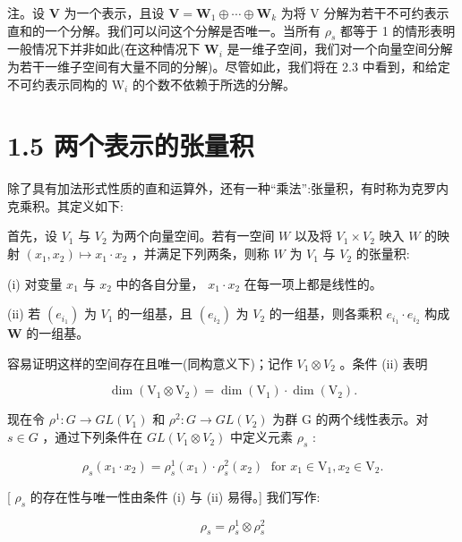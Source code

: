 \documentclass[10pt]{article}
\begin{document}
注。设 \(\mathbf{V}\) 为一个表示，且设 \(\mathbf{V} = {\mathbf{W}}_{1} \oplus  \cdots  \oplus  {\mathbf{W}}_{k}\) 为将 \(\mathrm{V}\) 分解为若干不可约表示直和的一个分解。我们可以问这个分解是否唯一。当所有 \({\rho }_{s}\) 都等于 1 的情形表明一般情况下并非如此(在这种情况下 \({\mathbf{W}}_{i}\) 是一维子空间，我们对一个向量空间分解为若干一维子空间有大量不同的分解)。尽管如此，我们将在 2.3 中看到，和给定不可约表示同构的 \({\mathrm{W}}_{i}\) 的个数不依赖于所选的分解。

\section*{1.5 两个表示的张量积}

除了具有加法形式性质的直和运算外，还有一种“乘法”:张量积，有时称为克罗内克乘积。其定义如下:

首先，设 \({V}_{1}\) 与 \({V}_{2}\) 为两个向量空间。若有一空间 \(W\) 以及将 \({V}_{1} \times  {V}_{2}\) 映入 \(W\) 的映射 \(\left( {{x}_{1},{x}_{2}}\right)  \mapsto  {x}_{1} \cdot  {x}_{2}\) ，并满足下列两条，则称 \(W\) 为 \({V}_{1}\) 与 \({V}_{2}\) 的张量积:

(i) 对变量 \({x}_{1}\) 与 \({x}_{2}\) 中的各自分量， \({x}_{1} \cdot  {x}_{2}\) 在每一项上都是线性的。

(ii) 若 \(\left( {e}_{{i}_{1}}\right)\) 为 \({V}_{1}\) 的一组基，且 \(\left( {e}_{{i}_{2}}\right)\) 为 \({V}_{2}\) 的一组基，则各乘积 \({e}_{{i}_{1}} \cdot  {e}_{{i}_{2}}\) 构成 \(\mathbf{W}\) 的一组基。

容易证明这样的空间存在且唯一(同构意义下)；记作 \({V}_{1} \otimes  {V}_{2}\) 。条件 (ii) 表明

\[
\dim \left( {{\mathrm{V}}_{1} \otimes  {\mathrm{V}}_{2}}\right)  = \dim \left( {\mathrm{V}}_{1}\right)  \cdot  \dim \left( {\mathrm{V}}_{2}\right) .
\]

现在令 \({\rho }^{1} : G \rightarrow  {GL}\left( {V}_{1}\right)\) 和 \({\rho }^{2} : G \rightarrow  {GL}\left( {V}_{2}\right)\) 为群 G 的两个线性表示。对 \(s \in  G\) ，通过下列条件在 \({GL}\left( {{V}_{1} \otimes  {V}_{2}}\right)\) 中定义元素 \({\rho }_{s}\) :

\[
{\rho }_{s}\left( {{x}_{1} \cdot  {x}_{2}}\right)  = {\rho }_{s}^{1}\left( {x}_{1}\right)  \cdot  {\rho }_{s}^{2}\left( {x}_{2}\right) \;\text{ for }{x}_{1} \in  {\mathrm{V}}_{1},{x}_{2} \in  {\mathrm{V}}_{2}.
\]

[ \({\rho }_{s}\) 的存在性与唯一性由条件 (i) 与 (ii) 易得。] 我们写作:

\[
{\rho }_{s} = {\rho }_{s}^{1} \otimes  {\rho }_{s}^{2}
\]
\end{document}

